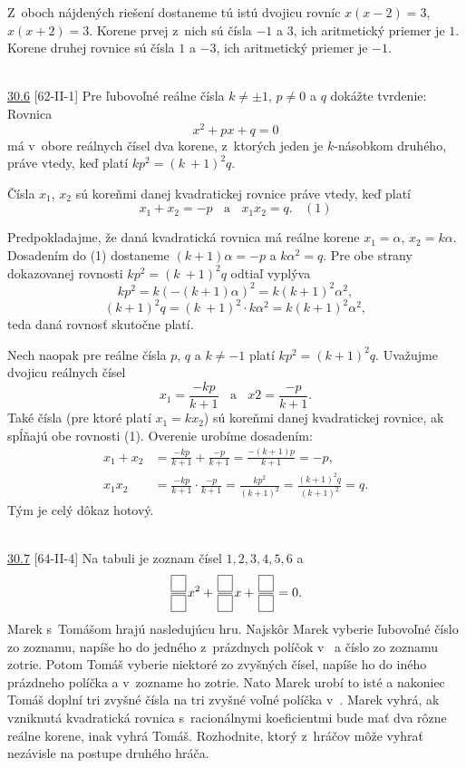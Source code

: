 Z~oboch nájdených riešení dostaneme tú istú dvojicu rovníc $x(x - 2) = 3$, $x(x + 2) = 3$. Korene prvej z~nich sú čísla $-1$ a $3$, ich aritmetický priemer je $1$. Korene druhej rovnice sú čísla $1$ a $-3$, ich aritmetický priemer je $-1$.\\
\\
\begin{tcolorbox}[breakable,notitle,boxrule=0pt,colback=light-gray,colframe=light-gray]\ul{30.6} [62-II-1] Pre ľubovoľné reálne čísla $k\neq \pm 1$, $p \neq 0$ a $q$ dokážte tvrdenie: Rovnica
$$x^2+ px + q = 0$$
má v~obore reálnych čísel dva korene, z~ktorých jeden je $k$-násobkom druhého, práve vtedy, keď platí $kp^2 = (k~+ 1)^2 q$.

\end{tcolorbox}

\rieh Čísla $x_1$, $x_2$ sú koreňmi danej kvadratickej rovnice práve vtedy, keď platí
$$x_1 + x_2 = -p \ \ \ \ \text{a} \ \ \ \  x_1 x_2 = q. \ \ \ \  (1)$$

Predpokladajme, že daná kvadratická rovnica má reálne korene $x_1 = \alpha$, $x_2 = k\alpha$.
Dosadením do (1) dostaneme $(k + 1)\alpha = -p$ a $k\alpha^2 = q$. Pre obe strany dokazovanej
rovnosti $kp^2 = (k~+ 1)^2 q$ odtiaľ vyplýva
$$kp^2= k(-(k + 1)\alpha)^2= k(k + 1)^2\alpha^2,$$
$$(k + 1)^2q = (k~+ 1)^2 \cdot k\alpha^2= k(k + 1)^2\alpha^2,$$
teda daná rovnosť skutočne platí.

Nech naopak pre reálne čísla $p$, $q$ a $k \neq -1$ platí $kp^2 = (k+1)^2q$. Uvažujme dvojicu
reálnych čísel
$$x_1 =\frac{-kp}{k + 1} \ \ \ \ \text{a} \ \ \ \  x 2 =\frac{-p}{k + 1}.$$
Také čísla (pre ktoré platí $x_1 = kx_2$) sú koreňmi danej kvadratickej rovnice, ak spĺňajú obe rovnosti (1). Overenie urobíme dosadením:
\begin{align*}
x_1 + x_2 &= \frac{-kp}{k + 1}+\frac{-p}{k + 1}=\frac{-(k + 1)p}{k + 1}= -p,\\
x_1 x_2 &=\frac{-kp}{k + 1}\cdot\frac{-p}{k + 1}=\frac{kp^2}{(k + 1)^2}=\frac{(k + 1)^2q}{(k + 1)^2}= q.
\end{align*}
Tým je celý dôkaz hotový.\\
\\
\begin{tcolorbox}[breakable,notitle,boxrule=0pt,colback=light-gray,colframe=light-gray]\ul{30.7} [64-II-4]  Na tabuli je zoznam čísel $1, 2, 3, 4, 5, 6$ a 
$$\frac{\fbox{$\phantom{7}$}}{\fbox{$\phantom{7}$}}x^2+\frac{\fbox{$\phantom{7}$}}{\fbox{$\phantom{7}$}}x + \frac{\fbox{$\phantom{7}$}}{\fbox{$\phantom{7}$}}= 0.$$
Marek s~Tomášom hrajú nasledujúcu hru. Najskôr Marek vyberie ľubovoľné číslo zo zoznamu, napíše ho do jedného z~prázdnych políčok v~ a číslo zo zoznamu zotrie. Potom Tomáš vyberie niektoré zo zvyšných čísel, napíše ho do iného prázdneho políčka a v~zozname ho zotrie. Nato Marek urobí to isté a nakoniec Tomáš doplní tri zvyšné čísla na tri zvyšné voľné políčka v~. Marek vyhrá, ak vzniknutá kvadratická rovnica s~racionálnymi koeficientmi bude mať dva rôzne reálne korene, inak vyhrá Tomáš. Rozhodnite, ktorý z~hráčov môže vyhrať nezávisle na postupe druhého
hráča.

\end{tcolorbox}

